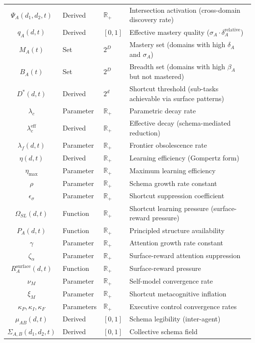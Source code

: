\documentclass[11pt,a4paper]{article}
\newcommand{\R}{\mathbb{R}}
\begin{document}
\begin{center}
{\begin{tabular}{c l l l}
$\Psi_A(d_1,d_2,t)$ & Derived & $\R_+$ & Intersection activation (cross-domain discovery rate) \\
$q_A(d,t)$ & Derived & $[0,1]$ & Effective mastery quality ($\sigma_A \cdot \delta_A^{\text{relative}}$) \\
$M_A(t)$ & Set & $2^D$ & Mastery set (domains with high $\delta_A$ and $\sigma_A$) \\
$B_A(t)$ & Set & $2^D$ & Breadth set (domains with high $\beta_A$ but not mastered) \\
$D^*(d,t)$ & Derived & $2^d$ & Shortcut threshold (sub-tasks achievable via surface patterns) \\
$\lambda_c$ & Parameter & $\R_+$ & Parametric decay rate \\
$\lambda_c^{\text{eff}}$ & Derived & $\R_+$ & Effective decay (schema-mediated reduction) \\
$\lambda_f(d,t)$ & Parameter & $\R_+$ & Frontier obsolescence rate \\
$\eta(d,t)$ & Derived & $\R_+$ & Learning efficiency (Gompertz form) \\
$\eta_{\max}$ & Parameter & $\R_+$ & Maximum learning efficiency \\
$\rho$ & Parameter & $\R_+$ & Schema growth rate constant \\
$\epsilon_\sigma$ & Parameter & $\R_+$ & Shortcut suppression coefficient \\
$\Omega_{SL}(d,t)$ & Function & $\R_+$ & Shortcut learning pressure (surface-reward pressure) \\
$P_A(d,t)$ & Function & $\R_+$ & Principled structure availability \\
$\gamma$ & Parameter & $\R_+$ & Attention growth rate constant \\
$\zeta_\alpha$ & Parameter & $\R_+$ & Surface-reward attention suppression \\
$R_A^{\text{surface}}(d,t)$ & Function & $\R_+$ & Surface-reward pressure \\
$\nu_M$ & Parameter & $\R_+$ & Self-model convergence rate \\
$\xi_M$ & Parameter & $\R_+$ & Shortcut metacognitive inflation \\
$\kappa_P, \kappa_I, \kappa_F$ & Parameters & $\R_+$ & Executive control convergence rates \\
$\mu_{AB}(d,t)$ & Derived & $[0,1]$ & Schema legibility (inter-agent) \\
$\Sigma_{A,B}(d_1,d_2,t)$ & Derived & $[0,1]$ & Collective schema field \\

\end{tabular}}
\end{center}
\end{document}
